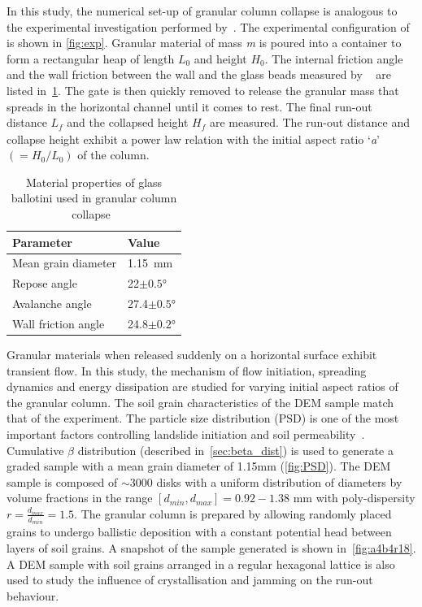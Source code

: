 In this study, the numerical set-up of granular column collapse is analogous to 
the  experimental investigation performed by~\citet{Lajeunesse2004}. The 
experimental configuration of~\citet{Lajeunesse2004} is shown in 
\cref{fig:exp}. Granular material of mass \textit{m} is poured into a 
container to form a rectangular heap of length ${L}_{\textit{0}}$ and height 
${H}_{\textit{0}}$. The internal friction angle 
and the wall friction between the wall and the glass beads measured by 
~\citet{Lajeunesse2004} are listed in~\cref{table:mat_prop}. The gate is then 
quickly removed to release the granular mass that spreads in the horizontal 
channel until it comes to rest. The final run-out distance ${L}_{\textit{f}}$ 
and the collapsed height $H_{\textit{f}}$ are measured. The run-out distance 
and collapse height exhibit a power law relation with the initial aspect ratio 
`\textit{a}' $(=H_{\textit{0}}/L_{\textit{0}})$ of the column. 

\begin{table}[tbhp]
\caption{Material properties of glass ballotini used in granular column 
collapse~\citep{Lajeunesse2004}}
\label{table:mat_prop}
\centering
\begin{tabular}{ll}
\toprule
\textbf{Parameter} & \textbf{Value} \\ \midrule
Mean grain diameter & 1.15~\si{\mm} \\
Repose angle & 22$\pm 0.5$\si{\degree} \\
Avalanche angle & 27.4$\pm 0.5$\si{\degree} \\
Wall friction angle & 24.8$\pm 0.2$\si{\degree}\\
\bottomrule
\end{tabular}
\end{table}


Granular materials when released suddenly on a 
horizontal surface exhibit transient flow. In this study, the mechanism of flow 
initiation, spreading dynamics and energy dissipation are studied for varying 
initial aspect ratios of the granular column. The soil grain characteristics of 
the DEM sample match that of the experiment. The particle size distribution 
(PSD) is one of the most important factors controlling landslide initiation and 
soil permeability~\citep{Utili2014}. Cumulative $\beta$ distribution (described 
in~\cref{sec:beta_dist}) is used to generate a graded sample with a mean grain 
diameter of 1.15\si{\mm} (\cref{fig:PSD}). 
The DEM sample is composed of $\sim3000$ disks with a uniform distribution of 
diameters by volume fractions in the range $[d_{min}, d_{max}] = 0.92 - 1.38$ 
\si{\mm} with poly-dispersity $r = \frac{d_{max} }{d_{min}} = 1.5$. The 
granular column is prepared by allowing randomly placed grains to undergo 
ballistic deposition with a constant potential head between layers of soil 
grains. A snapshot of the sample generated is shown in~\cref{fig:a4b4r18}. A 
DEM sample with soil grains arranged in a regular hexagonal lattice is also 
used to study the influence of crystallisation and jamming on the run-out 
behaviour.

